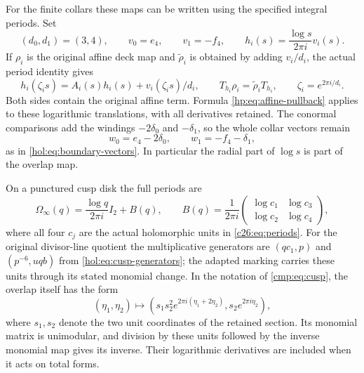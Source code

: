 For the finite collars these maps can be written using the
specified integral periods. Set
\[
 (d_0,d_1)=(3,4),\qquad v_0=e_4,\qquad v_1=-f_4,
 \qquad h_i(s)=\frac{\log s}{2\pi i}v_i(s).
\]
If $\rho_i$ is the original affine deck map and
$\widetilde\rho_i$ is obtained by adding $v_i/d_i$, the actual
period identity gives
\[
 h_i(\zeta_i s)=A_i(s)h_i(s)+v_i(\zeta_i s)/d_i,
 \qquad
 T_{h_i}\rho_i=\widetilde\rho_iT_{h_i},
 \qquad \zeta_i=e^{2\pi i/d_i}.
\]
Both sides contain the original affine term. Formula
\eqref{hp:eq:affine-pullback} applies to these logarithmic
translations, with all derivatives retained. The conormal
comparisons add the windings $-2\delta_0$ and $-\delta_1$,
so the whole collar vectors remain
\[
 w_0=e_4-2\delta_0,\qquad w_1=-f_4-\delta_1,
\]
as in \eqref{hol:eq:boundary-vectors}. In particular the radial
part of $\log s$ is part of the overlap map.

On a punctured cusp disk the full periods are
\begin{equation}\label{hp:eq:cusp-periods}
 \Omega_\infty(q)=\frac{\log q}{2\pi i}I_2+B(q),
 \qquad
 B(q)=\frac1{2\pi i}
 \begin{pmatrix}\log c_1&\log c_3\\\log c_2&\log c_4\end{pmatrix},
\end{equation}
where all four $c_j$ are the actual holomorphic units in
\eqref{c26:eq:periods}. For the original divisor-line quotient
the multiplicative generators are
$(q c_1,p)$ and $(p^{-6},u q b)$ from
\eqref{hol:eq:cusp-generators}; the adapted marking carries
these units through its stated monomial change. In the notation
of \eqref{cmp:eq:cusp}, the overlap itself has the form
\[
 (\eta_1,\eta_2)\longmapsto
 \left(s_1s_2^2e^{2\pi i(\eta_1+2\eta_2)},
                     s_2e^{2\pi i\eta_2}\right),
\]
where $s_1,s_2$ denote the two unit coordinates of the retained
section. Its monomial matrix is unimodular, and division by
these units followed by the inverse monomial map gives its
inverse. Their logarithmic derivatives are included when it
acts on total forms.

